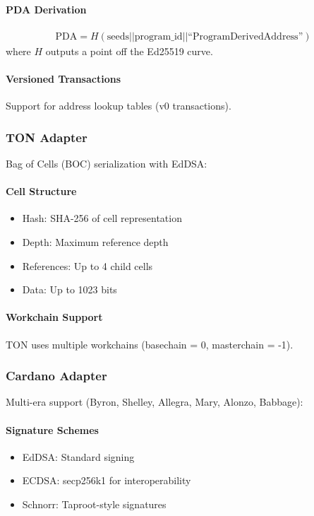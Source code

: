 \paragraph{PDA Derivation}
\begin{align*}
\text{PDA} = H(\text{seeds} || \text{program\_id} || \text{``ProgramDerivedAddress''})
\end{align*}
where $H$ outputs a point off the Ed25519 curve.

\paragraph{Versioned Transactions} Support for address lookup tables (v0 transactions).

\subsubsection{TON Adapter}

Bag of Cells (BOC) serialization with EdDSA:

\paragraph{Cell Structure}
\begin{itemize}
\item Hash: SHA-256 of cell representation
\item Depth: Maximum reference depth
\item References: Up to 4 child cells
\item Data: Up to 1023 bits
\end{itemize}

\paragraph{Workchain Support} TON uses multiple workchains (basechain = 0, masterchain = -1).

\subsubsection{Cardano Adapter}

Multi-era support (Byron, Shelley, Allegra, Mary, Alonzo, Babbage):

\paragraph{Signature Schemes}
\begin{itemize}
\item EdDSA: Standard signing
\item ECDSA: secp256k1 for interoperability
\item Schnorr: Taproot-style signatures
\end{itemize}

